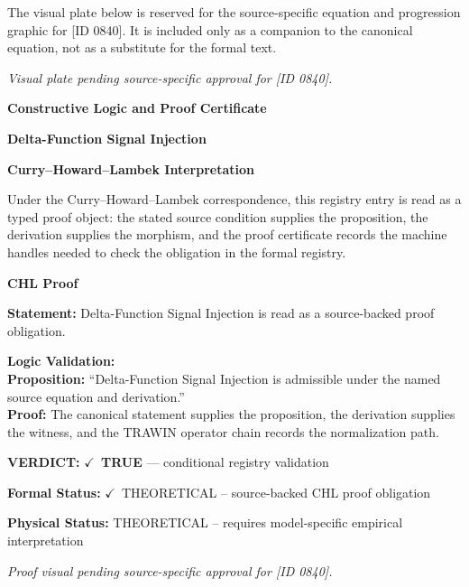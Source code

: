 \begingroup\footnotesize\sloppy
The visual plate below is reserved for the source-specific equation and progression graphic for [ID 0840]. It is included only as a companion to the canonical equation, not as a substitute for the formal text.
\par\endgroup
\begingroup\footnotesize\itshape
Visual plate pending source-specific approval for [ID 0840].
\par\endgroup

\clearpage
\begingroup\tzpsupportsetup
\noindent\textbf{\fontsize{10.8pt}{12.8pt}\selectfont [ID 0840] Constructive Logic and Proof Certificate}\par
\noindent\textbf{\fontsize{10pt}{12pt}\selectfont Delta-Function Signal Injection}\par
\vspace{0.45em}
\begingroup
\footnotesize
\setlength{\parskip}{0.22em}
\setlength{\parindent}{0pt}
\noindent\textbf{Curry--Howard--Lambek Interpretation}\par
Under the Curry--Howard--Lambek correspondence, this registry entry is read as a typed proof
object: the stated source condition supplies the proposition, the derivation supplies the
morphism, and the proof certificate records the machine handles needed to check the obligation
in the formal registry.

\vspace{0.45em}
\noindent\textbf{CHL Proof}\par
\textbf{Statement:} Delta-Function Signal Injection is read as a source-backed proof obligation.

\textbf{Logic Validation:}\\
\textbf{Proposition:} ``Delta-Function Signal Injection is admissible under the named source equation and derivation.''\\
\textbf{Proof:} The canonical statement supplies the proposition, the derivation supplies the witness, and the TRAWIN operator chain records the normalization path.

\textbf{VERDICT:} \ensuremath{\checkmark}\ \textbf{TRUE} --- conditional registry validation

\textbf{Formal Status:} \ensuremath{\checkmark}\ THEORETICAL -- source-backed CHL proof obligation

\textbf{Physical Status:} THEORETICAL -- requires model-specific empirical interpretation
\par\vspace{0.45em}
\par
\vfill
\begingroup\footnotesize\itshape
Proof visual pending source-specific approval for [ID 0840].
\par\endgroup
\vfill
\endgroup
\endgroup
